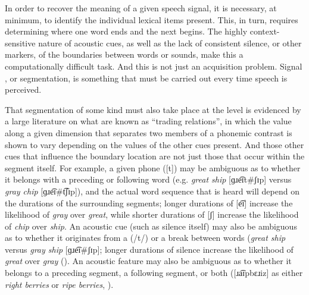 In order to recover the meaning of a given speech signal, it is necessary,
at minimum, to identify the individual lexical items present. This,
in turn, requires determining where one word ends and the next begins.
The highly context-sensitive nature of acoustic cues, as well as the
lack of consistent silence, or other markers, of the boundaries between
words or sounds, make this a computationally difficult task. And this
is not just an acquisition problem. Signal , or segmentation,
is something that must be carried out every time speech is perceived. 

That segmentation of some kind must also take place at the 
level is evidenced by a large literature on what are known as “trading
relations”, in which the value along a given  dimension
that separates two members of a phonemic contrast is shown to vary
depending on the values of the other  cues present. And those
other cues that influence the boundary location are not just those
that occur within the segment itself. For example, a given phone ({[t]})
may be ambiguous as to whether it belongs with a preceding or following
word (e.g. \textit{great ship} {[}{ɡɹe͡ɪt}\#{ʃɪp}{]}
versus \textit{gray chip} {[}{ɡɹe͡ɪ}\#{t͡ʃɪp}{]}),
and the actual word sequence that is heard will depend on the durations
of the surrounding segments; longer durations of {[e͡ɪ]}
increase the likelihood of \textit{gray} over \textit{great}, while
shorter durations of {[ʃ]} increase the likelihood of \textit{chip}
over \textit{ship}. An acoustic cue (such as silence itself) may also
be ambiguous as to whether it originates from a  ({/t/})
or a break between words (\textit{great ship} versus \textit{gray ship}
{[}{ɡɹe͡ɪ}\#{ʃɪp}{]}; longer durations of silence
increase the likelihood of \textit{great} over \textit{gray} (\citealt{repp1978perceptual}).
An acoustic feature may also be ambiguous as to whether it belongs
to a preceding segment, a following segment, or both ({[}{ɹa͡ɪpbɛɹiz}{]}
as either \textit{right berries} or \textit{ripe berries}, \citealt{Gow2003}). 

